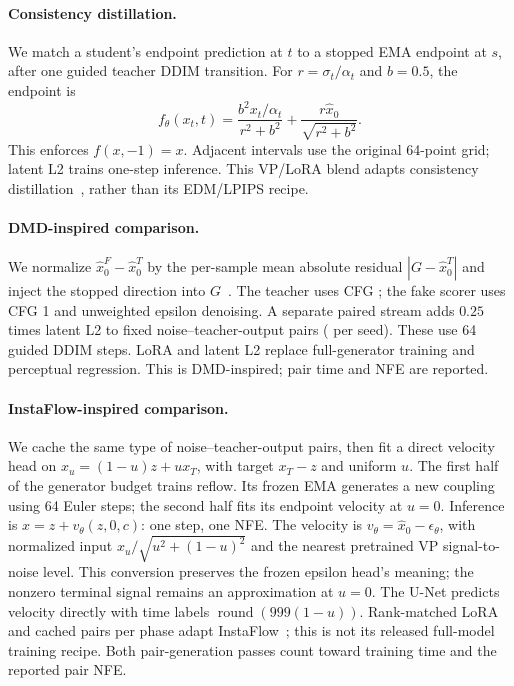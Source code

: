 \documentclass[10pt,twocolumn,letterpaper]{article}
\begin{document}
\ifStudySD
\paragraph{Consistency distillation.}
We match a student's endpoint prediction at $t$ to a stopped EMA endpoint at
$s$, after one guided teacher DDIM transition. For $r=\sigma_t/\alpha_t$ and
$b=0.5$, the endpoint is
\begin{equation}
 f_\theta(x_t,t)=\frac{b^2x_t/\alpha_t}{r^2+b^2}
                  +\frac{r\hat x_0}{\sqrt{r^2+b^2}}.
\end{equation}
This enforces $f(x,-1)=x$. Adjacent intervals use the original 64-point grid;
latent L2 trains one-step inference. This VP/LoRA blend adapts consistency
distillation~\cite{song2023consistency}, rather than its EDM/LPIPS recipe.

\paragraph{DMD-inspired comparison.}
We normalize $\hat x_0^{F}-\hat x_0^{T}$ by the per-sample mean absolute residual
$|G-\hat x_0^{T}|$ and inject the stopped direction into $G$~\cite{yin2024dmd}.
The teacher uses CFG \StudyGuidance{}; the fake scorer uses CFG 1 and unweighted
epsilon denoising. A separate paired stream adds $0.25$ times latent L2 to fixed
noise--teacher-output pairs (\StudyDMDPairs{} per seed). These use 64 guided
DDIM steps. LoRA and latent L2 replace full-generator training and perceptual
regression. This is DMD-inspired; pair time and NFE are reported.

\paragraph{InstaFlow-inspired comparison.}
We cache the same type of noise--teacher-output pairs, then fit a direct
velocity head on $x_u=(1-u)z+u x_T$, with target $x_T-z$ and uniform $u$.
The first half of the generator budget trains reflow. Its frozen EMA generates
a new coupling using 64 Euler steps; the second half fits its endpoint velocity
at $u=0$. Inference is $x=z+v_\theta(z,0,c)$: one step, one NFE.
\ifStudyFlowVP
The velocity is $v_\theta=\hat x_0-\epsilon_\theta$, with normalized input
$x_u/\sqrt{u^2+(1-u)^2}$ and the nearest pretrained VP signal-to-noise level.
This conversion preserves the frozen epsilon head's meaning; the nonzero
terminal signal remains an approximation at $u=0$.
\else
The U-Net predicts velocity directly with time labels
$\operatorname{round}(999(1-u))$.
\fi
Rank-matched LoRA and \StudyFlowPairs{} cached pairs per phase adapt
InstaFlow~\cite{liu2024instaflow}; this is not its released
full-model training recipe. Both pair-generation passes count toward training
time and the reported pair NFE.
\fi
\end{document}

